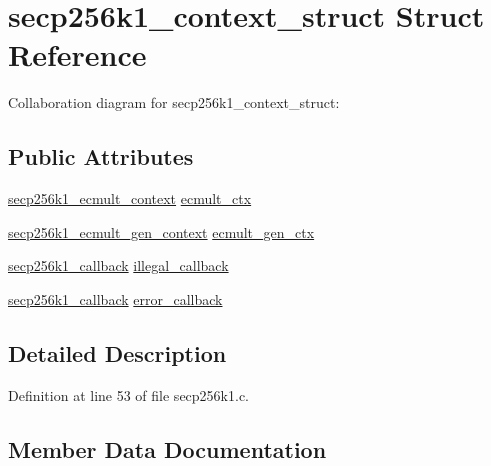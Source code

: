 \hypertarget{structsecp256k1__context__struct}{}\section{secp256k1\+\_\+context\+\_\+struct Struct Reference}
\label{structsecp256k1__context__struct}


Collaboration diagram for secp256k1\+\_\+context\+\_\+struct\+:
\subsection*{Public Attributes}
\begin{DoxyCompactItemize}
\item 
\hyperlink{structsecp256k1__ecmult__context}{secp256k1\+\_\+ecmult\+\_\+context} \hyperlink{structsecp256k1__context__struct_ab6a825dd98cab724df0f0060cf515eab}{ecmult\+\_\+ctx}
\item 
\hyperlink{structsecp256k1__ecmult__gen__context}{secp256k1\+\_\+ecmult\+\_\+gen\+\_\+context} \hyperlink{structsecp256k1__context__struct_aacc2071a68f9c5a6c05eb783f523b9eb}{ecmult\+\_\+gen\+\_\+ctx}
\item 
\hyperlink{structsecp256k1__callback}{secp256k1\+\_\+callback} \hyperlink{structsecp256k1__context__struct_a6f73572b18e62b306c5699e9e1470ab5}{illegal\+\_\+callback}
\item 
\hyperlink{structsecp256k1__callback}{secp256k1\+\_\+callback} \hyperlink{structsecp256k1__context__struct_aa34a996f869676899e8625adfb6c6f1d}{error\+\_\+callback}
\end{DoxyCompactItemize}


\subsection{Detailed Description}


Definition at line 53 of file secp256k1.\+c.



\subsection{Member Data Documentation}
\hypertarget{structsecp256k1__context__struct_ab6a825dd98cab724df0f0060cf515eab}{}
